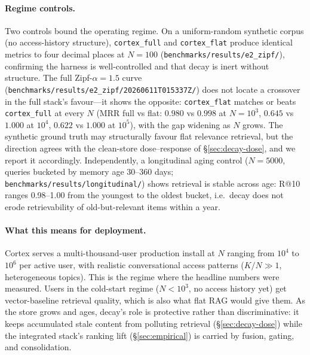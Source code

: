 \documentclass[11pt]{article}
\begin{document}
\paragraph{Regime controls.}
Two controls bound the operating regime.  On a uniform-random
synthetic corpus (no access-history structure), \texttt{cortex\_full}
and \texttt{cortex\_flat} produce identical metrics to four decimal
places at $N=100$ (\texttt{benchmarks/results/e2\_zipf/}), confirming
the harness is well-controlled and that decay is inert without
structure.  The full Zipf-$\alpha{=}1.5$ curve
(\texttt{benchmarks/results/e2\_zipf/20260611T015337Z/}) does not
locate a crossover in the full stack's favour---it shows the
opposite: \texttt{cortex\_flat} matches or beats \texttt{cortex\_full}
at every $N$ (MRR full vs flat: $0.980$ vs $0.998$ at $N{=}10^3$,
$0.645$ vs $1.000$ at $10^4$, $0.622$ vs $1.000$ at $10^5$), with
the gap widening as $N$ grows.  The synthetic ground truth may
structurally favour flat relevance retrieval, but the direction
agrees with the clean-store dose--response of
\S\ref{sec:decay-dose}, and we report it accordingly.  Independently,
a longitudinal aging control ($N=5000$, queries bucketed by memory
age 30--360 days; \texttt{benchmarks/results/longitudinal/}) shows
retrieval is stable across age: R@10 ranges 0.98--1.00 from the
youngest to the oldest bucket, i.e.\ decay does not erode
retrievability of old-but-relevant items within a year.

\paragraph{What this means for deployment.}  Cortex serves a
multi-thousand-user production install at $N$ ranging from $10^4$ to
$10^6$ per active user, with realistic conversational access
patterns ($K/N \gg 1$, heterogeneous topics).  This is the regime
where the headline numbers were measured.  Users in the cold-start
regime ($N < 10^3$, no access history yet) get vector-baseline
retrieval quality, which is also what flat RAG would give them.  As
the store grows and ages, decay's role is protective rather than
discriminative: it keeps accumulated stale content from polluting
retrieval (\S\ref{sec:decay-dose}) while the integrated stack's
ranking lift (\S\ref{sec:empirical}) is carried by fusion, gating,
and consolidation.
\end{document}
